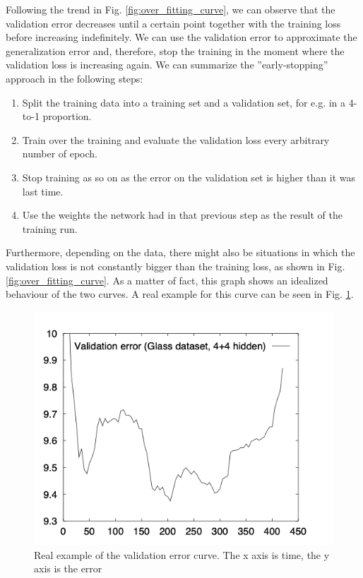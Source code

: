 Following the trend in Fig. \ref{fig:over_fitting_curve}, we can observe that the validation error decreases until a certain point together with the training loss before increasing indefinitely. We can use the validation error to approximate the generalization error and, therefore, stop the training in the moment where the validation loss is increasing again. 
We can summarize the ''early-stopping'' approach in the following steps:
\begin{enumerate}
\item Split the training data into a training set and a validation set, for e.g. in a 4-to-1 proportion.
\item Train over the training and evaluate the validation loss every arbitrary number of epoch.
\item Stop training as so on as the error on the validation set is higher than it was last time.
\item Use the weights the network had in that previous step as the result of the training run.

\end{enumerate}
Furthermore, depending on the data, there might also be situations in which the validation loss is not constantly bigger than the training loss, as shown in Fig. \ref{fig:over_fitting_curve}. As a matter of fact, this graph shows an idealized behaviour of the two curves. A real example for this curve can be seen in Fig. \ref{fig:over_fitting_curve_real}.
\begin{figure}[htb]
    \centering
    \includegraphics[scale = 0.4]{img/over_fitting_real.png}
    \caption[Real example of the validation error curve]{Real example of the validation error curve. The x axis is time, the y axis is the error \cite{early_stopping}}
    \label{fig:over_fitting_curve_real}
\end{figure}

